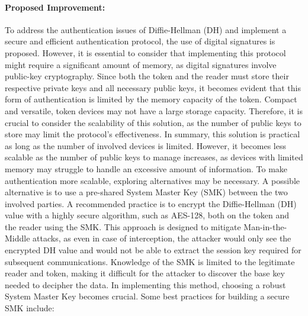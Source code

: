 \documentclass[12pt]{article}
\begin{document}
    \paragraph{Proposed Improvement:}
    To address the authentication issues of Diffie-Hellman (DH) and implement a secure and efficient authentication protocol, the use of digital signatures is proposed. However, it is essential to consider that implementing this protocol might require a significant amount of memory, as digital signatures involve public-key cryptography.
    Since both the token and the reader must store their respective private keys and all necessary public keys, it becomes evident that this form of authentication is limited by the memory capacity of the token. Compact and versatile, token devices may not have a large storage capacity. Therefore, it is crucial to consider the scalability of this solution, as the number of public keys to store may limit the protocol's effectiveness.
    In summary, this solution is practical as long as the number of involved devices is limited. However, it becomes less scalable as the number of public keys to manage increases, as devices with limited memory may struggle to handle an excessive amount of information. To make authentication more scalable, exploring alternatives may be necessary.
    A possible alternative is to use a pre-shared System Master Key (SMK) between the two involved parties. A recommended practice is to encrypt the Diffie-Hellman (DH) value with a highly secure algorithm, such as AES-128, both on the token and the reader using the SMK. This approach is designed to mitigate Man-in-the-Middle attacks, as even in case of interception, the attacker would only see the encrypted DH value and would not be able to extract the session key required for subsequent communications. Knowledge of the SMK is limited to the legitimate reader and token, making it difficult for the attacker to discover the base key needed to decipher the data.
    In implementing this method, choosing a robust System Master Key becomes crucial. Some best practices for building a secure SMK include:
\end{document}
